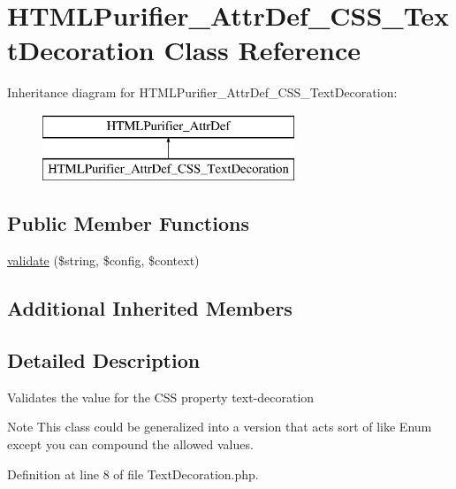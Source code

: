\hypertarget{classHTMLPurifier__AttrDef__CSS__TextDecoration}{\section{H\+T\+M\+L\+Purifier\+\_\+\+Attr\+Def\+\_\+\+C\+S\+S\+\_\+\+Text\+Decoration Class Reference}
\label{classHTMLPurifier__AttrDef__CSS__TextDecoration}
}
Inheritance diagram for H\+T\+M\+L\+Purifier\+\_\+\+Attr\+Def\+\_\+\+C\+S\+S\+\_\+\+Text\+Decoration\+:\begin{figure}[H]
\begin{center}
\leavevmode
\includegraphics[height=2.000000cm]{classHTMLPurifier__AttrDef__CSS__TextDecoration}
\end{center}
\end{figure}
\subsection*{Public Member Functions}
\begin{DoxyCompactItemize}
\item 
\hyperlink{classHTMLPurifier__AttrDef__CSS__TextDecoration_a11fe370cb5ffc3b14c2d08d1d0353876}{validate} (\$string, \$config, \$context)
\end{DoxyCompactItemize}
\subsection*{Additional Inherited Members}


\subsection{Detailed Description}
Validates the value for the C\+S\+S property text-\/decoration \begin{DoxyNote}{Note}
This class could be generalized into a version that acts sort of like Enum except you can compound the allowed values. 
\end{DoxyNote}


Definition at line 8 of file Text\+Decoration.\+php.



